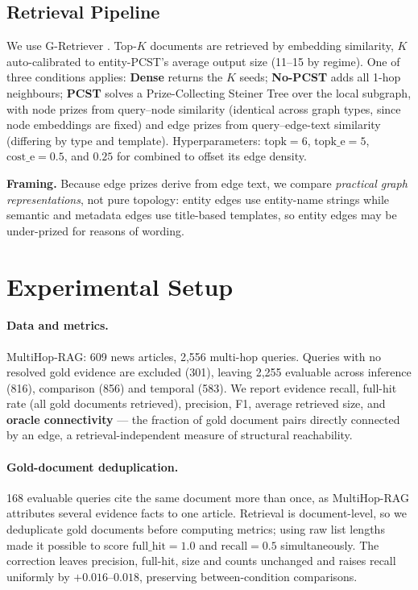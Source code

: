 \documentclass[11pt]{article}
\begin{document}
\subsection{Retrieval Pipeline}

We use G-Retriever \citep{he2024gretriever}. Top-$K$ documents are retrieved by embedding similarity, $K$ auto-calibrated to entity-PCST's average output size (11--15 by regime). One of three conditions applies: \textbf{Dense} returns the $K$ seeds; \textbf{No-PCST} adds all 1-hop neighbours; \textbf{PCST} solves a Prize-Collecting Steiner Tree over the local subgraph, with node prizes from query--node similarity (identical across graph types, since node embeddings are fixed) and edge prizes from query--edge-text similarity (differing by type and template). Hyperparameters: $\mathrm{topk}{=}6$, $\mathrm{topk\_e}{=}5$, $\mathrm{cost\_e}{=}0.5$, and $0.25$ for combined to offset its edge density.

\textbf{Framing.} Because edge prizes derive from edge text, we compare \textit{practical graph representations}, not pure topology: entity edges use entity-name strings while semantic and metadata edges use title-based templates, so entity edges may be under-prized for reasons of wording.

\section{Experimental Setup}

\paragraph{Data and metrics.} MultiHop-RAG: 609 news articles, 2,556 multi-hop queries. Queries with no resolved gold evidence are excluded (301), leaving 2,255 evaluable across inference (816), comparison (856) and temporal (583). We report evidence recall, full-hit rate (all gold documents retrieved), precision, F1, average retrieved size, and \textbf{oracle connectivity} --- the fraction of gold document pairs directly connected by an edge, a retrieval-independent measure of structural reachability.

\paragraph{Gold-document deduplication.} 168 evaluable queries cite the same document more than once, as MultiHop-RAG attributes several evidence facts to one article. Retrieval is document-level, so we deduplicate gold documents before computing metrics; using raw list lengths made it possible to score $\mathrm{full\_hit}{=}1.0$ and $\mathrm{recall}{=}0.5$ simultaneously. The correction leaves precision, full-hit, size and counts unchanged and raises recall uniformly by $+0.016$--$0.018$, preserving between-condition comparisons.
\end{document}
